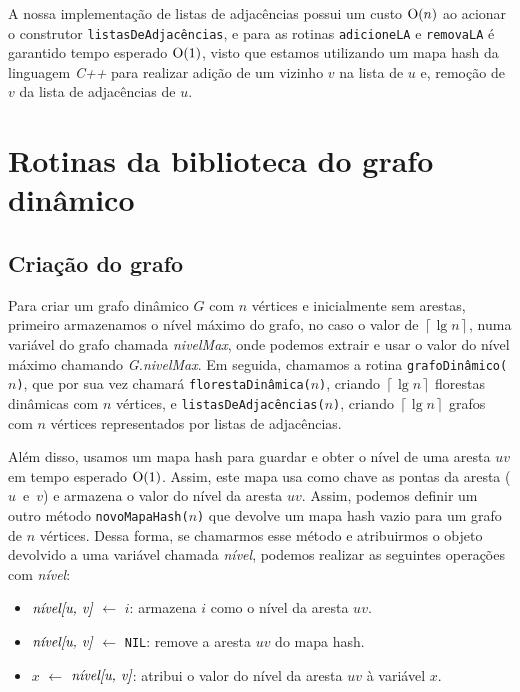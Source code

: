A nossa implementação \cite{chung2025} de listas de adjacências possui um custo $\mathrm{O}(n)$ ao acionar o construtor \texttt{listasDeAdjacências}, e para 
as rotinas \texttt{adicioneLA} e \texttt{removaLA} é garantido tempo esperado $\mathrm{O}(1)$, visto que estamos utilizando um mapa hash da linguagem \textit{C++} para realizar adição de um vizinho $v$ na lista de $u$ e, remoção de $v$ da lista de adjacências de $u$.

\section{Rotinas da biblioteca do grafo dinâmico}
\label{sec:dynamic-graph-routines}

\subsection{Criação do grafo}
\label{sec:dynamic-graph-creation}

Para criar um grafo dinâmico $G$ com $n$ vértices e inicialmente sem arestas, primeiro armazenamos o nível máximo do grafo, no caso o valor de $\left\lceil \lg n \right\rceil$, numa variável do grafo chamada \textit{nivelMax}, onde podemos extrair e usar o valor do nível máximo chamando \textit{G.nivelMax}. Em seguida, chamamos a rotina \texttt{grafoDinâmico($n$)}, que por sua vez chamará \texttt{florestaDinâmica($n$)}, criando $\left\lceil \lg n \right\rceil$ florestas dinâmicas com $n$ vértices, e \texttt{listasDeAdjacências($n$)}, criando $\left\lceil \lg n \right\rceil$ grafos com $n$ vértices representados por listas de adjacências. 

Além disso, usamos um mapa hash para guardar e obter o nível de uma aresta $uv$ em tempo esperado $\mathrm{O}(1)$. Assim, este mapa usa como chave as pontas da aresta ($u$~e~$v$) e armazena o valor do nível da aresta $uv$. Assim, podemos definir um outro método \texttt{novoMapaHash($n$)} que devolve um mapa hash vazio para um grafo de $n$ vértices. Dessa forma, se chamarmos esse método e atribuirmos o objeto devolvido a uma variável chamada \textit{nível}, podemos realizar as seguintes operações com \textit{nível}:

\begin{itemize}
    \item $\emph{nível[u, v]}$ $\leftarrow$ $i$: armazena $i$ como o nível da aresta $uv$.
    
    \item $\emph{nível[u, v]}$ $\leftarrow$ \texttt{NIL}: remove a aresta $uv$ do mapa hash.
    
    \item $x$ $\leftarrow$ $\emph{nível[u, v]}$: atribui o valor do nível da aresta $uv$ à variável $x$. 
\end{itemize}

